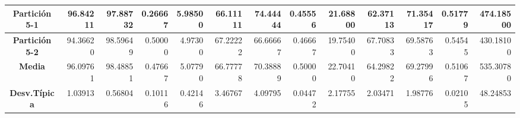 \documentclass[a4paper,11pt]{article}
\begin{document}
\begin{table}[H]
\begin{adjustbox}{width=1.1\textwidth}
\begin{tabular}{|c|r|r|r|r|r|r|r|r|r|r|r|r|}
  \textbf{Partición 5-1} & 96.84211 & 97.88732 & 0.26667 & 5.98500 & 66.11111 & 74.44444 & 0.45556 & 21.68800 & 62.37113 & 71.35417 & 0.51779 & 474.18500 \\ \hline
  \textbf{Partición 5-2} & 94.36620 & 98.59649 & 0.50000 & 4.97300 & 67.22222 & 66.66667 & 0.46667 & 19.75400 & 67.70833 & 69.58763 & 0.54545 & 430.18100 \\ \hline
  \textbf{Media} & 96.09761 & 98.48851 & 0.47667 & 5.07790 & 66.77778 & 70.38889 & 0.50000 & 22.70410 & 64.29822 & 69.27996 & 0.51067 & 535.30780 \\ \hline
  \textbf{Desv.Típica} & 1.03913 & 0.56804 & 0.10116 & 0.42146 & 3.46767 & 4.09795 & 0.04472 & 2.17755 & 2.03471 & 1.98776 & 0.02105 & 48.24853 \\ \hline
  \end{tabular}
  \end{adjustbox}
  \label{ILS}
  \end{table}
  
\end{document}
